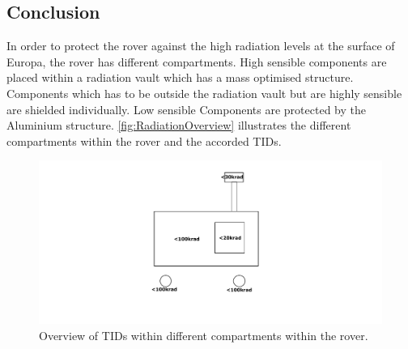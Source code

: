 \subsection{Conclusion}

\label{subsec:RadiationConclusion}

In order to protect the rover against the high radiation levels at the surface of Europa, the rover has different compartments. High sensible components are placed within a radiation vault which has a mass optimised structure. Components which has to be outside the radiation vault but are highly sensible are shielded individually. Low sensible Components are protected by the Aluminium structure. \autoref{fig:RadiationOverview} illustrates the different compartments within the rover and the accorded TIDs.

\begin{figure}[htb]
     \centering
     \includegraphics[width=\textwidth]{Media/RadiationOverview}
     \caption{Overview of TIDs within different compartments within the rover.}
     \label{fig:RadiationOverview}
\end{figure}

\cleardoublepage